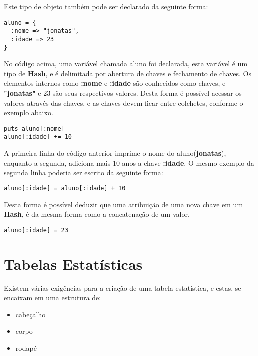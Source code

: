 \documentclass[espaco=simples,appendix=Name]{abnt}
\newcommand{\code}[1] {\textbf{#1}}
\begin{document}
Este tipo de objeto também pode ser declarado da seguinte forma:

\begin{lstlisting}[caption=Sintaxe de declaração de um \code{Hash}]
aluno = { 
  :nome => "jonatas",
  :idade => 23
}
\end{lstlisting}

No código acima, uma variável chamada aluno foi declarada, esta variável é um tipo de \code{Hash}, e é delimitada por abertura de chaves e fechamento de chaves. Os elementos internos como \code{:nome} e \code{:idade} são conhecidos como chaves, e \code{"jonatas"} e 23 são seus respectivos valores. Desta forma é possível acessar os valores através das chaves, e as chaves devem ficar entre colchetes, conforme o exemplo abaixo. 


\begin{lstlisting}[caption=Usufruindo dos métodos do \code{Hash}]
puts aluno[:nome] 
aluno[:idade] += 10
\end{lstlisting}

A primeira linha do código anterior imprime o nome do aluno(\code{jonatas}), enquanto a segunda, adiciona mais 10 anos a chave \code{:idade}. O mesmo exemplo da segunda linha poderia ser escrito da seguinte forma:

\begin{lstlisting}[caption=Somando 10 anos a chave :idade]
aluno[:idade] = aluno[:idade] + 10
\end{lstlisting}

Desta forma é possível deduzir que uma atribuição de uma nova chave em um \code{Hash}, é da mesma forma como a concatenação de um valor.

\begin{lstlisting}[caption=Atribuindo o valor 23 para a chave :idade da variável aluno]
aluno[:idade] = 23 
\end{lstlisting}

\section { Tabelas Estatísticas }

Existem várias exigências para a criação de uma tabela estatística, e estas, se encaixam em uma estrutura de:


\begin{itemize} 
  \item{cabeçalho}
  \item{corpo}
  \item{rodapé}
\end{itemize} 
\end{document}
